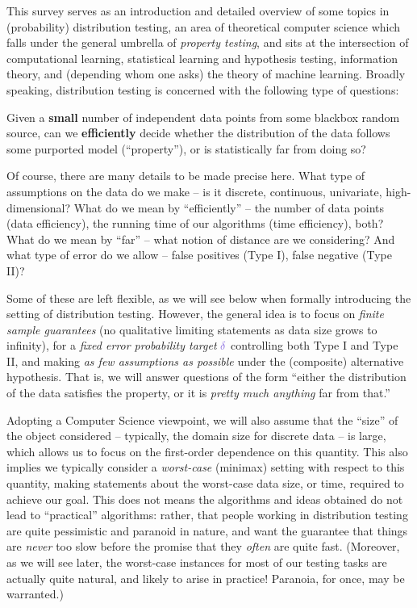This survey serves as an introduction and detailed overview of some topics in (probability) distribution testing, an area of theoretical computer science which falls under the general umbrella of \emph{property testing}, and sits at the intersection of computational learning, statistical learning and hypothesis testing, information theory, and (depending whom one asks) the theory of machine learning. Broadly speaking, distribution testing is concerned with the following type of questions: 
\begin{framed}
 Given a \textbf{small} number of independent data points from some blackbox random source, can we \textbf{efficiently} decide whether the distribution of the data follows some purported model (``property''), or is statistically far from doing so?
\end{framed}

Of course, there are many details to be made precise here. What type of assumptions on the data do we make -- is it discrete, continuous, univariate, high-dimensional?  What do we mean by ``efficiently'' -- the number of data points (data efficiency), the running time of our algorithms (time efficiency), both? What do we mean by ``far'' -- what notion of distance are we considering? And what type of error do we allow -- false positives (Type I), false negative (Type II)?

Some of these are left flexible, as we will see below when formally introducing the setting of distribution testing. However, the general idea is to focus on \emph{finite sample guarantees} (no qualitative limiting statements as data size grows to infinity), for a \emph{fixed error probability target} $\errprob$ controlling both Type I and Type II, and making \emph{as few assumptions as possible} under the (composite) alternative hypothesis. That is, we will answer questions of the form ``either the distribution of the data satisfies the property, or it is \emph{pretty much anything} far from that.''


Adopting a Computer Science viewpoint, we will also assume that the ``size'' of the object considered -- typically, the domain size for discrete data -- is large, which allows us to focus on the first-order dependence on this quantity. This also implies we typically consider a \emph{worst-case} (minimax) setting with respect to this quantity, making statements about the worst-case data size, or time, required to achieve our goal. This does not means the algorithms and ideas obtained do not lead to ``practical'' algorithms: rather, that people working in distribution testing are quite pessimistic and paranoid in nature, and want the guarantee that things are \emph{never} too slow before the promise that they \emph{often} are quite fast. (Moreover, as we will see later, the worst-case instances for most of our testing tasks are actually quite natural, and likely to arise in practice! Paranoia, for once, may be warranted.)

